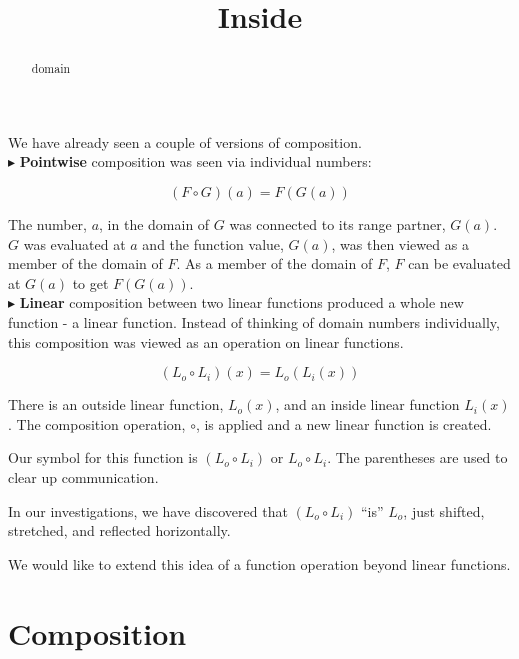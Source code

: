 \documentclass{ximera}
\title{Inside}
\begin{document}
\begin{abstract}
domain
\end{abstract}
\maketitle



We have already seen a couple of versions of composition. \\

$\blacktriangleright$ \textbf{\textcolor{purple!85!blue}{Pointwise}} composition was seen via individual numbers: 

\[ (F \circ G)(a) = F(G(a)) \]

The number, $a$, in the domain of $G$ was connected to its range partner, $G(a)$.  $G$ was evaluated at $a$ and the function value, $G(a)$, was then viewed as a member of the domain of $F$.  As a member of the domain of $F$, $F$ can be evaluated at $G(a)$ to get $F(G(a))$. \\




$\blacktriangleright$ \textbf{\textcolor{purple!85!blue}{Linear}} composition between two linear functions produced a whole new function - a linear function.  Instead of thinking of domain numbers individually, this composition was viewed as an operation on linear functions.

\[    (L_o \circ L_i)(x) = L_o(L_i(x))  \]

There is an outside linear function, $L_o(x)$, and an inside linear function $L_i(x)$.  The composition operation, $\circ$, is applied and a new linear function is created.  



Our symbol for this function is $(L_o \circ L_i)$ or $L_o \circ L_i$.  The parentheses are used to clear up communication.

In our investigations, we have discovered that $(L_o \circ L_i)$ ``is'' $L_o$, just shifted, stretched, and reflected horizontally.


We would like to extend this idea of a function operation beyond linear functions.





\section{Composition}
\end{document}

